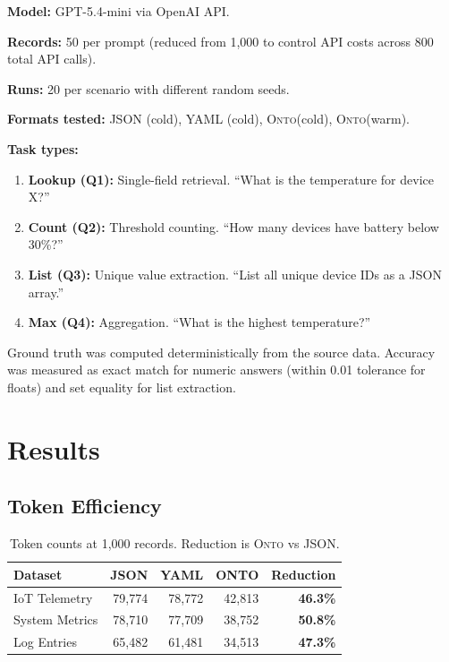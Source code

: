 \documentclass[10pt,twocolumn]{article}
\newcommand{\onto}{\textsc{Onto}\xspace}
\begin{document}
\textbf{Model:} GPT-5.4-mini via OpenAI API.

\textbf{Records:} 50 per prompt (reduced from 1,000 to control API costs across 800 total API calls).

\textbf{Runs:} 20 per scenario with different random seeds.

\textbf{Formats tested:} JSON (cold), YAML (cold), \onto (cold), \onto (warm).

\textbf{Task types:}
\begin{enumerate}[leftmargin=*,itemsep=0.1em]
    \item \textbf{Lookup (Q1):} Single-field retrieval. ``What is the temperature for device X?''
    \item \textbf{Count (Q2):} Threshold counting. ``How many devices have battery below 30\%?''
    \item \textbf{List (Q3):} Unique value extraction. ``List all unique device IDs as a JSON array.''
    \item \textbf{Max (Q4):} Aggregation. ``What is the highest temperature?''
\end{enumerate}

Ground truth was computed deterministically from the source data. Accuracy was measured as exact match for numeric answers (within 0.01 tolerance for floats) and set equality for list extraction.

\section{Results}

\subsection{Token Efficiency}

\begin{table}[t]
\centering
\caption{Token counts at 1,000 records. Reduction is \onto vs JSON.}
\label{tab:tokens}
\small
\begin{tabular}{lrrrr}
\toprule
\textbf{Dataset} & \textbf{JSON} & \textbf{YAML} & \textbf{ONTO} & \textbf{Reduction} \\
\midrule
IoT Telemetry & 79,774 & 78,772 & 42,813 & \textbf{46.3\%} \\
System Metrics & 78,710 & 77,709 & 38,752 & \textbf{50.8\%} \\
Log Entries & 65,482 & 61,481 & 34,513 & \textbf{47.3\%} \\
\bottomrule
\end{tabular}
\end{table}
\end{document}
